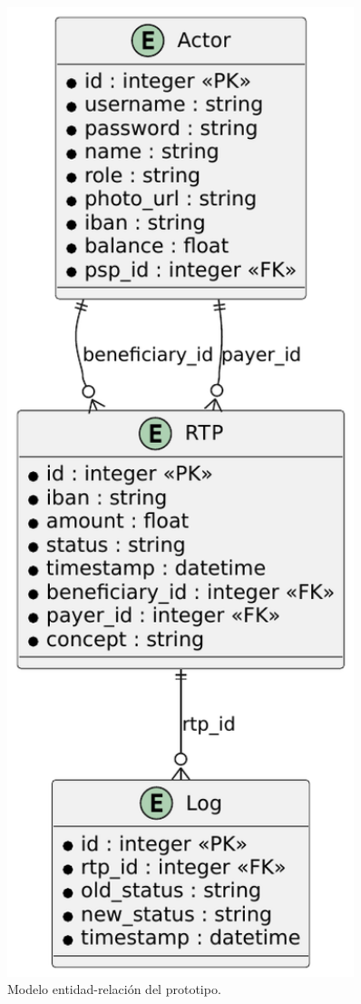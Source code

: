 \begin{figure}[htbp]
  \centering
  \includegraphics[width=0.9\textwidth, height=0.9\textheight, keepaspectratio]{Imagenes/ER.pdf}
  \caption{Modelo entidad-relación del prototipo.}
  \label{fig:er_model}
\end{figure}


